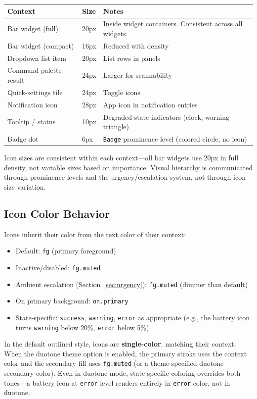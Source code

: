 \documentclass[11pt,a4paper]{article}
\begin{document}
\begin{longtable}{p{3cm} p{2cm} p{8.5cm}}
\toprule
\textbf{Context} & \textbf{Size} & \textbf{Notes} \\
\midrule
Bar widget (full) & 20px & Inside widget containers. Consistent across all widgets. \\
Bar widget (compact) & 16px & Reduced with density \\
Dropdown list item & 20px & List rows in panels \\
Command palette result & 24px & Larger for scannability \\
Quick-settings tile & 24px & Toggle icons \\
Notification icon & 28px & App icon in notification entries \\
Tooltip / status & 10px & Degraded-state indicators (clock, warning triangle) \\
Badge dot & 6px & \texttt{Badge} prominence level (colored circle, no icon) \\
\bottomrule
\end{longtable}

Icon sizes are consistent within each context---all bar widgets use 20px in full density, not variable sizes based on importance. Visual hierarchy is communicated through prominence levels and the urgency/escalation system, not through icon size variation.

\subsection{Icon Color Behavior}

Icons inherit their color from the text color of their context:
\begin{itemize}[leftmargin=1.5em, itemsep=2pt]
  \item Default: \texttt{fg} (primary foreground)
  \item Inactive/disabled: \texttt{fg.muted}
  \item Ambient escalation (Section~\ref{sec:urgency}): \texttt{fg.muted} (dimmer than default)
  \item On primary background: \texttt{on.primary}
  \item State-specific: \texttt{success}, \texttt{warning}, \texttt{error} as appropriate (e.g., the battery icon turns \texttt{warning} below 20\%, \texttt{error} below 5\%)
\end{itemize}

In the default outlined style, icons are \textbf{single-color}, matching their context. When the duotone theme option is enabled, the primary stroke uses the context color and the secondary fill uses \texttt{fg.muted} (or a theme-specified duotone secondary color). Even in duotone mode, state-specific coloring overrides both tones---a battery icon at \texttt{error} level renders entirely in \texttt{error} color, not in duotone.
\end{document}
